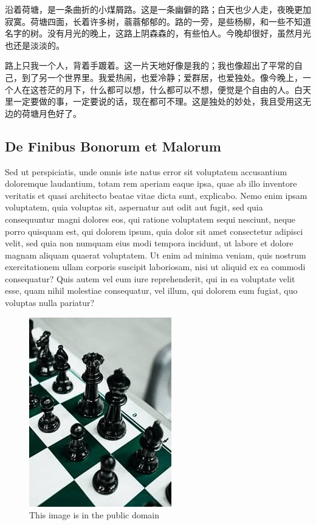 \documentclass[twoside, UTF8, a4paper]{ctexart}
\numberwithin{figure}{section}
\numberwithin{table}{section}
\numberwithin{equation}{section}
\begin{document}
沿着荷塘，是一条曲折的小煤屑路。这是一条幽僻的路；白天也少人走，夜晚更加寂寞。荷塘四面，长着许多树，蓊蓊郁郁的。路的一旁，是些杨柳，和一些不知道名字的树。没有月光的晚上，这路上阴森森的，有些怕人。今晚却很好，虽然月光也还是淡淡的。

路上只我一个人，背着手踱着。这一片天地好像是我的；我也像超出了平常的自己，到了另一个世界里。我爱热闹，也爱冷静；爱群居，也爱独处。像今晚上，一个人在这苍茫的月下，什么都可以想，什么都可以不想，便觉是个自由的人。白天里一定要做的事，一定要说的话，现在都可不理。这是独处的妙处，我且受用这无边的荷塘月色好了。




\clearpage
\begin{appendices}
\section{De Finibus Bonorum et Malorum}

Sed ut perspiciatis, unde omnis iste natus error sit voluptatem accusantium doloremque laudantium, totam rem aperiam eaque ipsa, quae ab illo inventore veritatis et quasi architecto beatae vitae dicta sunt, explicabo. Nemo enim ipsam voluptatem, quia voluptas sit, aspernatur aut odit aut fugit, sed quia consequuntur magni dolores eos, qui ratione voluptatem sequi nesciunt, neque porro quisquam est, qui dolorem ipsum, quia dolor sit amet consectetur adipisci velit, sed quia non numquam eius modi tempora incidunt, ut labore et dolore magnam aliquam quaerat voluptatem. Ut enim ad minima veniam, quis nostrum exercitationem ullam corporis suscipit laboriosam, nisi ut aliquid ex ea commodi consequatur? Quis autem vel eum iure reprehenderit, qui in ea voluptate velit esse, quam nihil molestiae consequatur, vel illum, qui dolorem eum fugiat, quo voluptas nulla pariatur?

\begin{figure}[!ht]
\centering
\includegraphics[width=0.3\linewidth]{./img/black-chess-pieces.jpg}
\caption{This image is in the public domain}
\label{fig:black-chess-pieces}
\end{figure}


\end{appendices}
\end{document}
